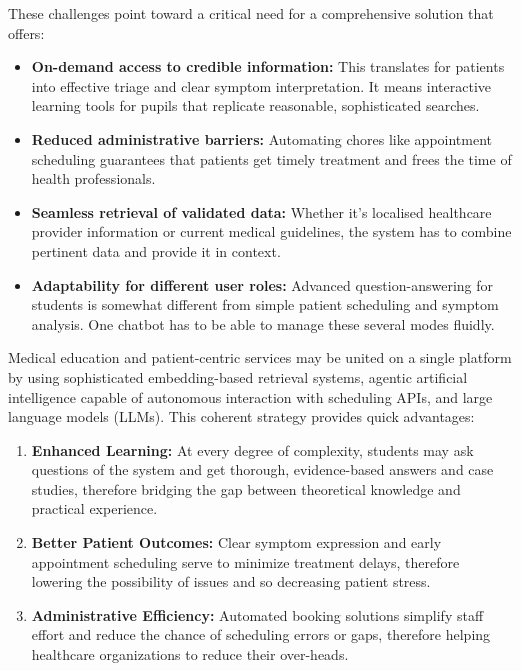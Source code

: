 \noindent These challenges point toward a critical need for a comprehensive solution that offers:
\begin{itemize}[itemsep=2em]
    \item \textbf{On-demand access to credible information:} 
    This translates for patients into effective triage and clear symptom interpretation. It means interactive learning tools for pupils that replicate reasonable, sophisticated searches.
    
    \item \textbf{Reduced administrative barriers:} 
    Automating chores like appointment scheduling guarantees that patients get timely treatment and frees the time of health professionals.
    
    \item \textbf{Seamless retrieval of validated data:} 
    Whether it's localised healthcare provider information or current medical guidelines, the system has to combine pertinent data and provide it in context.
    
    \item \textbf{Adaptability for different user roles:}
    Advanced question-answering for students is somewhat different from simple patient scheduling and symptom analysis. One chatbot has to be able to manage these several modes fluidly.
\end{itemize}


\noindent Medical education and patient-centric services may be united on a single platform by using sophisticated embedding-based retrieval systems, agentic artificial intelligence capable of autonomous interaction with scheduling APIs, and large language models (LLMs). This coherent strategy provides quick advantages:
\begin{enumerate}[itemsep=2em]
    \item \textbf{Enhanced Learning:} At every degree of complexity, students may ask questions of the system and get thorough, evidence-based answers and case studies, therefore bridging the gap between theoretical knowledge and practical experience.
    \item \textbf{Better Patient Outcomes:} Clear symptom expression and early appointment scheduling serve to minimize treatment delays, therefore lowering the possibility of issues and so decreasing patient stress.
    \item \textbf{Administrative Efficiency:} Automated booking solutions simplify staff effort and reduce the chance of scheduling errors or gaps, therefore helping healthcare organizations to reduce their over-heads.
\end{enumerate}


